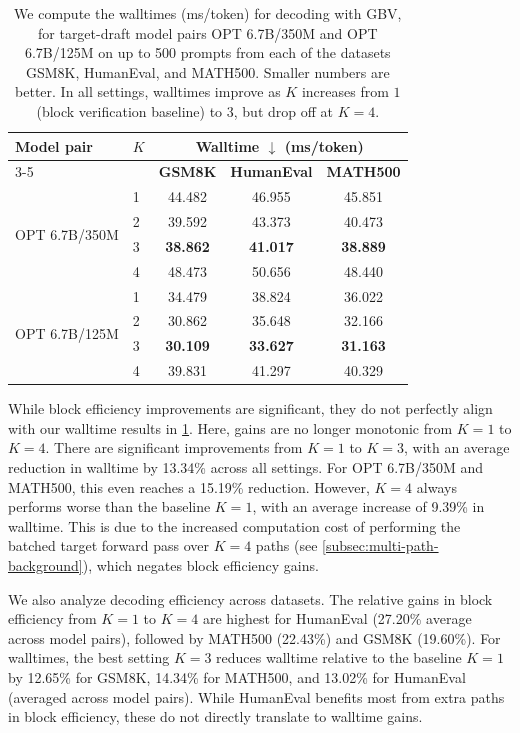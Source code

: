 \documentclass{article}
\theoremstyle{plain}
\theoremstyle{definition}
\theoremstyle{remark}
\begin{document}
\begin{table}[htbp]
\centering
\small
\setlength\tabcolsep{3pt}
\begin{tabular}{@{}llccc@{}}
\toprule
\textbf{Model pair} & \textbf{$K$} &
\multicolumn{3}{c}{\textbf{Walltime $\downarrow$} (ms/token)} \\
\cmidrule(lr){3-5}
& & \textbf{GSM8K} & \textbf{HumanEval} & \textbf{MATH500} \\
\midrule

\multirow{4}{*}{OPT 6.7B/350M}
& 1 & 44.482 & 46.955 & 45.851 \\
& 2 & 39.592 & 43.373 & 40.473 \\
& 3 & \textbf{38.862} & \textbf{41.017} & \textbf{38.889} \\
& 4 & 48.473 & 50.656 & 48.440 \\
\midrule
\multirow{4}{*}{OPT 6.7B/125M}
& 1 & 34.479 & 38.824 & 36.022 \\
& 2 & 30.862 & 35.648 & 32.166 \\
& 3 & \textbf{30.109} & \textbf{33.627} & \textbf{31.163} \\
& 4 & 39.831 & 41.297 & 40.329 \\
\bottomrule
\end{tabular}
\caption{We compute the walltimes (ms/token) for decoding with GBV, for target-draft model pairs OPT 6.7B/350M and OPT 6.7B/125M on up to 500 prompts from each of the datasets GSM8K, HumanEval, and MATH500. Smaller numbers are better. In all settings, walltimes improve as $K$ increases from $1$ (block verification baseline) to $3$, but drop off at $K=4$.}
\label{tab:throughput}
\end{table}


While block efficiency improvements are significant, they do not perfectly align with our walltime results in \cref{tab:throughput}. Here, gains are no longer monotonic from $K=1$ to $K=4$. There are significant improvements from $K=1$ to $K=3$, with an average reduction in walltime by 13.34\% across all settings. For OPT 6.7B/350M and MATH500, this even reaches a 15.19\% reduction. However, $K=4$ always performs worse than the baseline $K=1$, with an average increase of 9.39\% in walltime. This is due to the increased computation cost of performing the batched target forward pass over $K=4$ paths (see \cref{subsec:multi-path-background}), which negates block efficiency gains.

We also analyze decoding efficiency across datasets. The relative gains in block efficiency from $K=1$ to $K=4$ are highest for HumanEval (27.20\% average across model pairs), followed by MATH500 (22.43\%) and GSM8K (19.60\%). For walltimes, the best setting $K=3$ reduces walltime relative to the baseline $K=1$ by 12.65\% for GSM8K, 14.34\% for MATH500, and 13.02\% for HumanEval (averaged across model pairs). While HumanEval benefits most from extra paths in block efficiency, these do not directly translate to walltime gains. 
\end{document}
